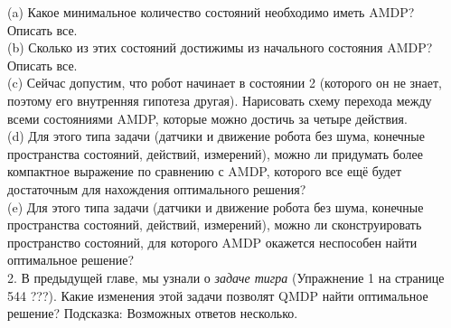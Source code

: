\documentclass[10pt,a4paper]{article}
\begin{document}
(a)	Какое минимальное количество состояний необходимо иметь AMDP? Описать все.\\

(b)	Сколько из этих состояний достижимы из начального состояния AMDP? Описать все.\\

(c)	Сейчас допустим, что робот начинает в состоянии 2 (которого он не знает, поэтому его внутренняя гипотеза другая). Нарисовать схему перехода между всеми состояниями AMDP, которые можно достичь за четыре действия.\\

(d)	Для этого типа задачи (датчики и движение робота без шума, конечные пространства состояний, действий, измерений), можно ли придумать более компактное выражение по сравнению с AMDP, которого все ещё будет достаточным для нахождения оптимального решения?\\

(e)	Для этого типа задачи (датчики и движение робота без шума, конечные пространства состояний, действий, измерений), можно ли сконструировать пространство состояний, для которого AMDP окажется неспособен найти оптимальное решение?\\

2.	В предыдущей главе, мы узнали о \textit{задаче тигра} (Упражнение 1 на странице 544 ???). Какие изменения этой задачи позволят QMDP найти оптимальное решение? Подсказка: Возможных ответов несколько.\\
\end{document}
